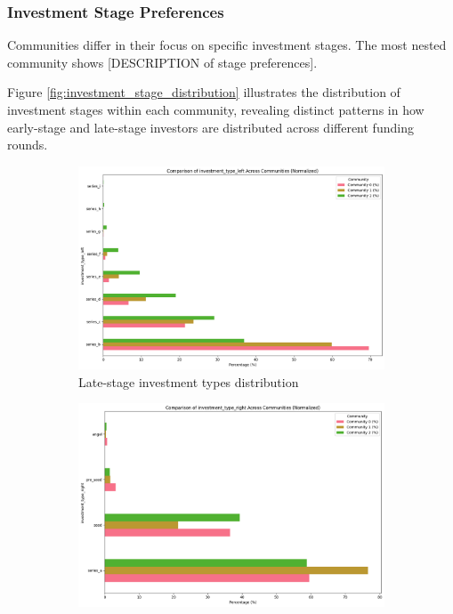 \documentclass[12pt]{article}
\begin{document}
\subsubsection{Investment Stage Preferences}

Communities differ in their focus on specific investment stages. The most nested community shows [DESCRIPTION of stage preferences].

Figure \ref{fig:investment_stage_distribution} illustrates the distribution of investment stages within each community, revealing distinct patterns in how early-stage and late-stage investors are distributed across different funding rounds.

\begin{figure}[htbp]
\centering
\begin{subfigure}{0.48\textwidth}
    \centering
    \includegraphics[width=\textwidth]{./assets/late-investment-types-distribution.png}
    \caption{Late-stage investment types distribution}
    \label{fig:late_stage_types}
\end{subfigure}
\hfill
\begin{subfigure}{0.48\textwidth}
    \centering
    \includegraphics[width=\textwidth]{./assets/early-investment-types-distribution.png}

\end{subfigure}
\end{figure}
\end{document}
